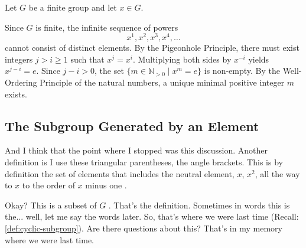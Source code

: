 
\begin{content}
Let $G$ be a finite group and let $x \in G$.


\begin{steps}
Since $G$ is finite, the infinite sequence of powers
\[
x^1, x^2, x^3, x^4, \dots
\]
cannot consist of distinct elements. By the Pigeonhole Principle, there must exist integers $j > i \ge 1$ such that $x^j = x^i$. Multiplying both sides by $x^{-i}$ yields $x^{j-i} = e$. Since $j - i > 0$, the set $\{m \in \mathbb{N}_{>0} \mid x^m = e\}$ is non-empty. By the Well-Ordering Principle of the natural numbers, a unique minimal positive integer $m$ exists.
\end{steps}
\end{content}

\subsection{The Subgroup Generated by an Element}

\begin{speech}[00:03:20 - 00:04:06]
And I think that the point where I stopped was this discussion. Another definition is I use these triangular parentheses, the angle brackets. This is by definition  the set of elements that includes the neutral element, $x$, $x^2$, all the way to $x$ to the order of $x$ minus one .

Okay? This is a subset of $G$ . That's the definition. Sometimes in words this is the... well, let me say the words later. So, that's where we were last time (Recall: \cref{def:cyclic-subgroup}). Are there questions about this? That's in my memory where we were last time.
\end{speech}

